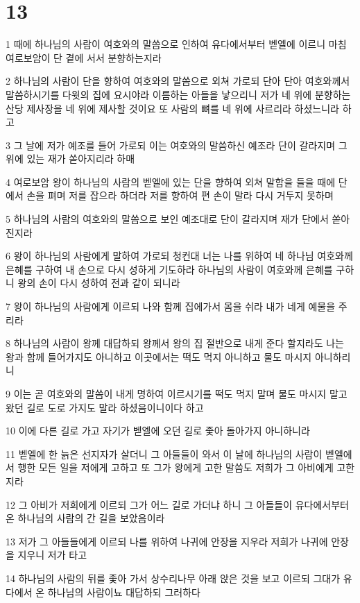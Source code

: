\chapter{13}

\par 1 때에 하나님의 사람이 여호와의 말씀으로 인하여 유다에서부터 벧엘에 이르니 마침 여로보암이 단 곁에 서서 분향하는지라
\par 2 하나님의 사람이 단을 향하여 여호와의 말씀으로 외쳐 가로되 단아 단아 여호와께서 말씀하시기를 다윗의 집에 요시야라 이름하는 아들을 낳으리니 저가 네 위에 분향하는 산당 제사장을 네 위에 제사할 것이요 또 사람의 뼈를 네 위에 사르리라 하셨느니라 하고
\par 3 그 날에 저가 예조를 들어 가로되 이는 여호와의 말씀하신 예조라 단이 갈라지며 그 위에 있는 재가 쏟아지리라 하매
\par 4 여로보암 왕이 하나님의 사람의 벧엘에 있는 단을 향하여 외쳐 말함을 들을 때에 단에서 손을 펴며 저를 잡으라 하더라 저를 향하여 편 손이 말라 다시 거두지 못하며
\par 5 하나님의 사람의 여호와의 말씀으로 보인 예조대로 단이 갈라지며 재가 단에서 쏟아진지라
\par 6 왕이 하나님의 사람에게 말하여 가로되 청컨대 너는 나를 위하여 네 하나님 여호와께 은혜를 구하여 내 손으로 다시 성하게 기도하라 하나님의 사람이 여호와께 은혜를 구하니 왕의 손이 다시 성하여 전과 같이 되니라
\par 7 왕이 하나님의 사람에게 이르되 나와 함께 집에가서 몸을 쉬라 내가 네게 예물을 주리라
\par 8 하나님의 사람이 왕께 대답하되 왕께서 왕의 집 절반으로 내게 준다 할지라도 나는 왕과 함께 들어가지도 아니하고 이곳에서는 떡도 먹지 아니하고 물도 마시지 아니하리니
\par 9 이는 곧 여호와의 말씀이 내게 명하여 이르시기를 떡도 먹지 말며 물도 마시지 말고 왔던 길로 도로 가지도 말라 하셨음이니이다 하고
\par 10 이에 다른 길로 가고 자기가 벧엘에 오던 길로 좇아 돌아가지 아니하니라
\par 11 벧엘에 한 늙은 선지자가 살더니 그 아들들이 와서 이 날에 하나님의 사람이 벧엘에서 행한 모든 일을 저에게 고하고 또 그가 왕에게 고한 말씀도 저희가 그 아비에게 고한지라
\par 12 그 아비가 저희에게 이르되 그가 어느 길로 가더냐 하니 그 아들들이 유다에서부터 온 하나님의 사람의 간 길을 보았음이라
\par 13 저가 그 아들들에게 이르되 나를 위하여 나귀에 안장을 지우라 저희가 나귀에 안장을 지우니 저가 타고
\par 14 하나님의 사람의 뒤를 좇아 가서 상수리나무 아래 앉은 것을 보고 이르되 그대가 유다에서 온 하나님의 사람이뇨 대답하되 그러하다
